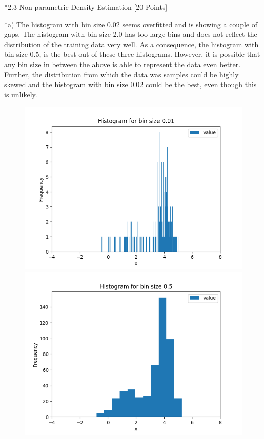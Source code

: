 \documentclass[12pt]{article}
\begin{document}
\begin{section}*{2.3 Non-parametric Density Estimation [20 Points]}
	\begin{subsection}*{a)}
		The histogram with bin size 0.02 seems overfitted and is showing a couple of gaps.
		The histogram with bin size 2.0 has too large bins and does not reflect the distribution of the training data very well. 
		As a consequence, the histogram with bin size 0.5, is the best out of these three histograms.
		However, it is possible that any bin size in between the above is able to represent the data even better.		
		Further, the distribution from which the data was samples could be highly skewed and the histogram with bin size 0.02 could be the best, even though this is unlikely. 
		
		\begin{figure}
			\includegraphics[scale=.4]{./hist_001}
			\includegraphics[scale=.4]{./hist_05}

\end{figure}
\end{subsection}
\end{section}
\end{document}
